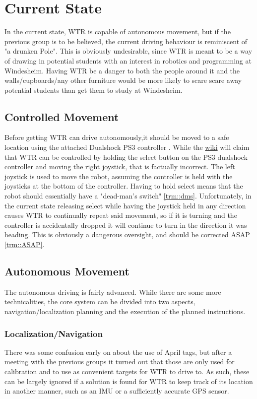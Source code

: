 \section{Current State}
In the current state, WTR is capable of autonomous movement, but if the previous group is to be believed, the current driving behaviour is reminiscent of "a drunken Pole".
This is obviously undesirable, since WTR is meant to be a way of drawing in potential students with an interest in robotics and programming at Windesheim.
Having WTR be a danger to both the people around it and the walls/cupboards/any other furniture would be more likely to scare scare away potential students than get them to study at Windesheim.

\subsection{Controlled Movement}
Before getting WTR can drive autonomously,it should be moved to a safe location using the attached Dualshock PS3 controller \cite{dualshock}.
While the \href{https://windesheim-willy.github.io/WillyWiki/components/joystick.html}{wiki} will claim that WTR can be controlled by holding the select button on the PS3 dualshock controller and moving the right joystick, that is factually incorrect.
The left joystick is used to move the robot, assuming the controller is held with the joysticks at the bottom of the controller.
Having to hold select means that the robot should essentially have a "dead-man's switch" \ref{trm::dms}.
Unfortunately, in the current state releasing select while having the joystick held in any direction causes WTR to continually repeat said movement, so if it is turning and the controller is accidentally dropped it will continue to turn in the direction it was heading.
This is obviously a dangerous oversight, and should be corrected ASAP \ref{trm::ASAP}.

\subsection{Autonomous Movement}
The autonomous driving is fairly advanced.
While there are some more technicalities, the core system can be divided into two aspects, navigation/localization planning and the execution of the planned instructions.


\subsubsection{Localization/Navigation}
There was some confusion early on about the use of April tags, but after a meeting with the previous groups it turned out that those are only used for calibration and to use as convenient targets for WTR to drive to.
As such, these can be largely ignored if a solution is found for WTR to keep track of its location in another manner, such as an IMU or a sufficiently accurate GPS sensor.

